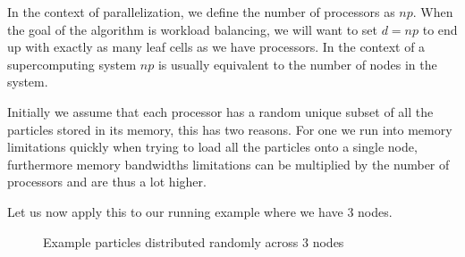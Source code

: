 \documentclass[]{article}
\begin{document}
In the context of parallelization, we define the number of processors as $np$. When the goal of the algorithm is workload balancing, we will want to set $d = np$ to end up with exactly as many leaf cells as we have processors. In the context of a supercomputing system $np$ is usually equivalent to the number of nodes in the system.

Initially we assume that each processor has a random unique subset of all the particles stored in its memory, this has two reasons. For one we run into memory limitations quickly when trying to load all the particles onto a single node, furthermore memory bandwidths limitations can be multiplied by the number of processors and are thus a lot higher. 

Let us now apply this to our running example where we have 3 nodes.

\begin{figure}[H]
	
	\centering
	\caption{Example particles distributed randomly across 3 nodes}
\end{figure}
\end{document}
